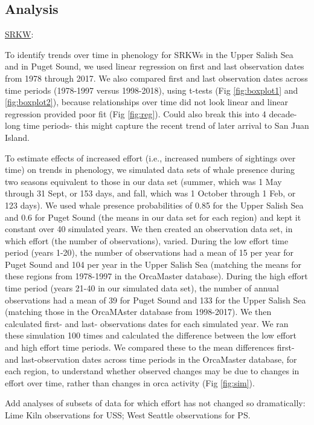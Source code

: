 \documentclass{article}
\begin{document}
\subsection* {Analysis}
\underline{SRKW}:
\par To identify trends over time in phenology for SRKWs in the Upper Salish Sea and in Puget Sound, we used linear regression on first  and last observation dates from 1978 through 2017. We also compared first and last observation dates across time periods (1978-1997 versus 1998-2018), using t-tests (Fig \ref{fig:boxplot1} and \ref{fig:boxplot2}), because relationships over time did not look linear and linear regression provided poor fit (Fig \ref{fig:reg}). Could also break this into 4 decade-long time periods- this might capture the recent trend of later arrival to San Juan Island. 
\par  To estimate effects of increased effort (i.e., increased numbers of sightings over time) on trends in phenology, we simulated data sets of whale presence during two seasons equivalent to those in our data set (summer, which was 1 May through 31 Sept, or 153 days, and fall, which was 1 October through 1 Feb, or 123 days). We used whale presence probabilities of 0.85 for the Upper Salish Sea and 0.6 for Puget Sound (the means in our data set for each region) and kept it constant over 40 simulated years. We then created an observation data set, in which effort (the number of observations), varied. During the low effort time period (years 1-20), the number of observations had a mean of 15 per year for Puget Sound and 104 per year in the Upper Salish Sea (matching the means for these regions from 1978-1997 in the OrcaMaster database).  During the high effort time period (years 21-40 in our simulated data set), the number of annual observations had a mean of 39 for Puget Sound and 133 for the Upper Salish Sea (matching those in the OrcaMAster database from 1998-2017). We then calculated first- and last- observations dates for each simulated year. We ran these simulation 100 times and calculated the difference between the low effort and high effort time periods. We compared these to the mean differences first- and last-observation dates across time periods in the OrcaMaster database, for each region, to understand whether observed changes may be due to changes in effort over time, rather than changes in orca activity (Fig \ref{fig:sim}).
\par Add analyses of subsets of data for which effort has not changed so dramatically: Lime Kiln observations for USS; West Seattle observations for PS.
\end{document}
